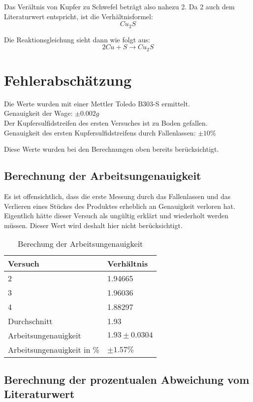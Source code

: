 \documentclass[11pt,paper=a4,final]{scrartcl}
\begin{document}
{Das Ver\"altnis von Kupfer zu Schwefel betr\"agt also nahezu 2. Da 2 auch dem
Literaturwert \cite{ifa:cs1} entspricht, ist die Verh\"altnisformel:
\[ Cu_2S \]

Die Reaktionsgleichung sieht dann wie folgt aus:
\[ 2Cu + S \to Cu_2S \]
\section{Fehlerabsch\"atzung}
Die Werte wurden mit einer Mettler Toledo B303-S ermittelt.\\
Genauigkeit der Wage: \(\pm 0.002g\)\\
Der Kupfersulfidstreifen des ersten Versuches ist zu Boden gefallen. \\
Genauigkeit des ersten Kupfersulfidstreifens durch Fallenlassen: \(\pm 10\% \)

Diese Werte wurden bei den Berechnungen oben bereits ber\"ucksichtigt.
\subsection{Berechnung der Arbeitsungenauigkeit}
Es ist offensichtlich, dass die erste Messung durch das Fallenlassen und das
Verlieren eines St\"uckes des Produktes erheblich an Genauigkeit verloren hat.
Eigentlich h\"atte dieser Versuch als ung\"ultig erkl\"art und wiederholt werden
m\"ussen. Dieser Wert wird deshalt hier nicht ber\"ucksichtigt.

\begin{table}[h!]
  \centering
  \begin{tabular}{|l|l|}\hline
    \bf Versuch & \bf Verh\"altnis \\ \hline
    2	& 1.94665 \\ \hline
    3 	& 1.96036 \\ \hline
    4	& 1.88297 \\ \hline
    Durchschnitt & 1.93 \\ \hline
    Arbeitsungenauigkeit & \(1.93 \pm 0.0304 \) \\ \hline
    Arbeitsungenauigkeit in \% & \(\pm 1.57\%\) \\ \hline
  \end{tabular}
  \caption{Berechung der Arbeitsungenauigkeit}
\end{table}

\subsection{Berechnung der prozentualen Abweichung vom Literaturwert}

}
\end{document}
